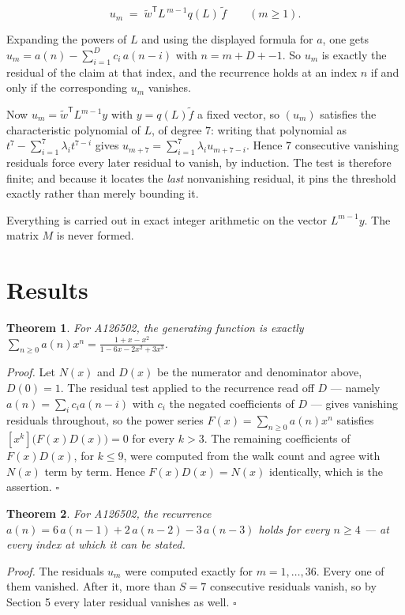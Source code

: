 \documentclass[11pt]{article}
\newtheorem{theorem}{Theorem}
\theoremstyle{definition}
\begin{document}
\[u_m \;=\; \tilde w^{\mathsf T} L^{\,m-1} q(L)\,\tilde f \qquad (m \ge 1).\]

Expanding the powers of $L$ and using the displayed formula for $a$, one gets $u_m = a(n) - \sum_{i=1}^{D} c_i\,a(n-i)$ with $n = m + D + -1$. So $u_m$ is exactly the residual of the claim at that index, and the recurrence holds at an index $n$ if and only if the corresponding $u_m$ vanishes.

Now $u_m = \tilde w^{\mathsf T} L^{m-1} y$ with $y = q(L)\tilde f$ a fixed vector, so $(u_m)$ satisfies the characteristic polynomial of $L$, of degree $7$: writing that polynomial as $t^{7} - \sum_{i=1}^{7} \lambda_i t^{7-i}$ gives $u_{m+7} = \sum_{i=1}^{7} \lambda_i u_{m+7-i}$. Hence $7$ consecutive vanishing residuals force every later residual to vanish, by induction. The test is therefore finite; and because it locates the {\itshape last} nonvanishing residual, it pins the threshold exactly rather than merely bounding it.

Everything is carried out in exact integer arithmetic on the vector $L^{m-1}y$. The matrix $M$ is never formed.

\section{Results}

\begin{theorem} For A126502, the generating function is exactly $\sum_{n\ge 0} a(n)x^n = \frac{1 + x - x^{2}}{1 - 6x - 2x^{2} + 3x^{3}}$.\end{theorem}

{\itshape Proof.} Let $N(x)$ and $D(x)$ be the numerator and denominator above, $D(0)=1$. The residual test applied to the recurrence read off $D$ --- namely $a(n) = \sum_i c_i a(n-i)$ with $c_i$ the negated coefficients of $D$ --- gives vanishing residuals throughout, so the power series $F(x)=\sum_{n\ge 0}a(n)x^n$ satisfies $[x^k]\bigl(F(x)D(x)\bigr) = 0$ for every $k > 3$. The remaining coefficients of $F(x)D(x)$, for $k \le 9$, were computed from the walk count and agree with $N(x)$ term by term. Hence $F(x)D(x) = N(x)$ identically, which is the assertion. $\square$

\begin{theorem} For A126502, the recurrence $a(n) = 6\,a(n-1) + 2\,a(n-2) - 3\,a(n-3)$ holds for every $n \ge 4$ --- at every index at which it can be stated.\end{theorem}

{\itshape Proof.} The residuals $u_m$ were computed exactly for $m = 1,\dots,36$. Every one of them vanished. After it, more than $S = 7$ consecutive residuals vanish, so by Section 5 every later residual vanishes as well. $\square$
\end{document}
